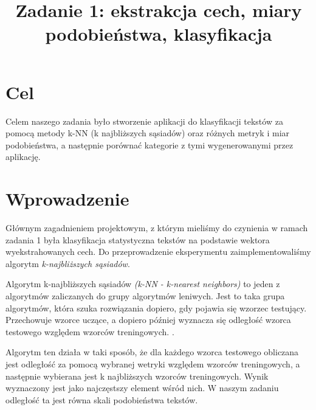 \documentclass{classrep}
\author{
  \studentinfo{Radosław Grela}{216769} \and
  \studentinfo{Jakub Wąchała}{216914} 
}
\title{Zadanie 1: ekstrakcja cech, miary podobieństwa, klasyfikacja}
\begin{document}
\maketitle

\section{Cel} %
Celem naszego zadania było stworzenie aplikacji do klasyfikacji tekstów za pomocą metody k-NN (k najbliższych sąsiadów) oraz
różnych metryk i miar podobieństwa, a następnie porównać kategorie z tymi wygenerowanymi przez aplikację.

\section{Wprowadzenie} %
Głównym zagadnieniem projektowym, z którym mieliśmy do czynienia w ramach zadania 1 była klasyfikacja statystyczna tekstów na podstawie wektora wyekstrahowanych cech. Do przeprowadzenie eksperymentu zaimplementowaliśmy algorytm \textsl{k-najbliższych sąsiadów}.

Algorytm k-najbliższych sąsiadów \textsl{(k-NN - k-nearest neighbors)} to jeden z algorytmów zaliczanych do grupy algorytmów leniwych. Jest to taka grupa algorytmów, która szuka rozwiązania dopiero, gdy pojawia się wzorzec testujący. Przechowuje wzorce uczące, a dopiero później wyznacza się odległość wzorca testowego względem wzorców treningowych. \cite{leniwy}. 

Algorytm ten działa w taki sposób, że dla każdego wzorca testowego obliczana jest odległość za pomocą wybranej wetryki względem wzorców treningowych, a następnie wybierana jest k najbliższych wzorców treningowych. Wynik wyznaczony jest jako najczęstszy element wśród nich. W naszym zadaniu odległość ta jest równa skali podobieństwa tekstów. 
\end{document}
